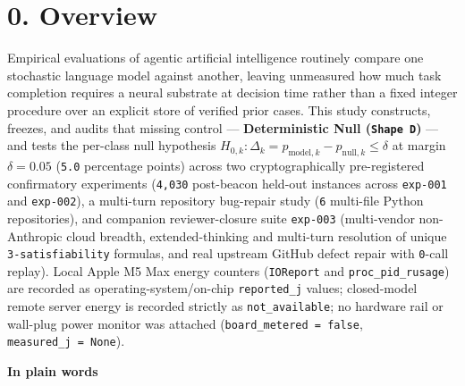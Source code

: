 \documentclass[10pt,letterpaper]{article}
\begin{document}
\section{0. Overview}\label{overview}

Empirical evaluations of agentic artificial intelligence routinely
compare one stochastic language model against another, leaving
unmeasured how much task completion requires a neural substrate at
decision time rather than a fixed integer procedure over an explicit
store of verified prior cases. This study constructs, freezes, and
audits that missing control --- \textbf{Deterministic Null
(\texttt{Shape\ D})} --- and tests the per-class null hypothesis
\(H_{0,k}: \Delta_k = p_{\text{model},k} - p_{\text{null},k} \le \delta\)
at margin \(\delta = 0.05\) (\texttt{5.0} percentage points) across two
cryptographically pre-registered confirmatory experiments
(\texttt{4,030} post-beacon held-out instances across \texttt{exp-001}
and \texttt{exp-002}), a multi-turn repository bug-repair study
(\texttt{6} multi-file Python repositories), and companion
reviewer-closure suite \texttt{exp-003} (multi-vendor non-Anthropic
cloud breadth, extended-thinking and multi-turn resolution of unique
\texttt{3-\allowbreak{}satisfiability} formulas, and real upstream GitHub defect
repair with \texttt{0}-call replay). Local Apple M5 Max energy counters
(\texttt{IOReport} and \texttt{proc\_\allowbreak{}pid\_\allowbreak{}rusage}) are recorded as
operating-system/on-chip \texttt{reported\_\allowbreak{}j} values; closed-model
remote server energy is recorded strictly as \texttt{not\_\allowbreak{}available}; no
hardware rail or wall-plug power monitor was attached
(\texttt{board\_\allowbreak{}metered\ =\ false}, \texttt{measured\_\allowbreak{}j\ =\ None}).

\textbf{In plain words}
\end{document}
